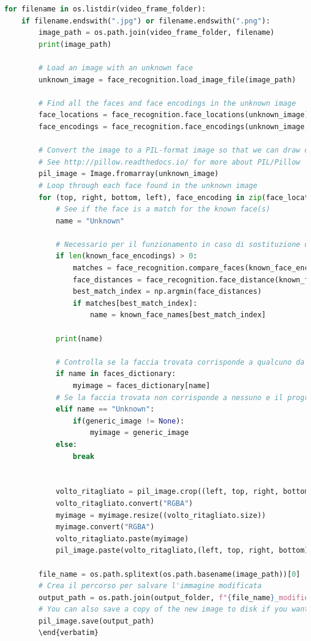 \documentclass{report}
\begin{document}
\begin{lstlisting}[language=Python, breaklines=true]
for filename in os.listdir(video_frame_folder):
    if filename.endswith(".jpg") or filename.endswith(".png"):
        image_path = os.path.join(video_frame_folder, filename)
        print(image_path)

        # Load an image with an unknown face
        unknown_image = face_recognition.load_image_file(image_path)

        # Find all the faces and face encodings in the unknown image
        face_locations = face_recognition.face_locations(unknown_image)
        face_encodings = face_recognition.face_encodings(unknown_image, face_locations)

        # Convert the image to a PIL-format image so that we can draw on top of it with the Pillow library
        # See http://pillow.readthedocs.io/ for more about PIL/Pillow
        pil_image = Image.fromarray(unknown_image)
        # Loop through each face found in the unknown image
        for (top, right, bottom, left), face_encoding in zip(face_locations, face_encodings):
            # See if the face is a match for the known face(s)
            name = "Unknown"

            # Necessario per il funzionamento in caso di sostituzione di tutte le facce senza facce da identificare
            if len(known_face_encodings) > 0:
                matches = face_recognition.compare_faces(known_face_encodings, face_encoding)
                face_distances = face_recognition.face_distance(known_face_encodings, face_encoding)
                best_match_index = np.argmin(face_distances)
                if matches[best_match_index]:
                    name = known_face_names[best_match_index]

            print(name)

            # Controlla se la faccia trovata corrisponde a qualcuno da indentificare
            if name in faces_dictionary:
                myimage = faces_dictionary[name]
            # Se la faccia trovata non corrisponde a nessuno e il programma ha arg -a sostituisci con immagine generica
            elif name == "Unknown":
                if(generic_image != None):
                    myimage = generic_image
            else:
                break


            volto_ritagliato = pil_image.crop((left, top, right, bottom))
            volto_ritagliato.convert("RGBA")
            myimage = myimage.resize((volto_ritagliato.size))
            myimage.convert("RGBA")
            volto_ritagliato.paste(myimage)
            pil_image.paste(volto_ritagliato,(left, top, right, bottom))

        file_name = os.path.splitext(os.path.basename(image_path))[0]
        # Crea il percorso per salvare l'immagine modificata
        output_path = os.path.join(output_folder, f"{file_name}_modified.png")
        # You can also save a copy of the new image to disk if you want by uncommenting this line
        pil_image.save(output_path)
        \end{verbatim}
\end{lstlisting}
\end{document}
